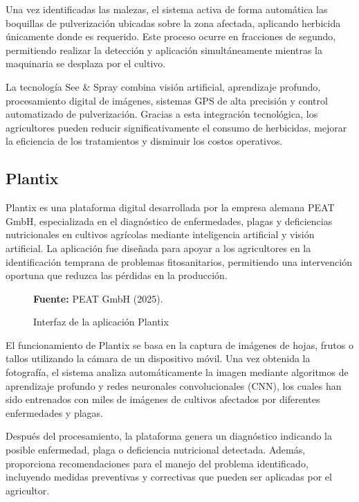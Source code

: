 Una vez identificadas las malezas, el sistema activa de forma automática las boquillas de pulverización ubicadas sobre la zona afectada, aplicando herbicida únicamente donde es requerido. Este proceso ocurre en fracciones de segundo, permitiendo realizar la detección y aplicación simultáneamente mientras la maquinaria se desplaza por el cultivo.

La tecnología See \& Spray combina visión artificial, aprendizaje profundo, procesamiento digital de imágenes, sistemas GPS de alta precisión y control automatizado de pulverización. Gracias a esta integración tecnológica, los agricultores pueden reducir significativamente el consumo de herbicidas, mejorar la eficiencia de los tratamientos y disminuir los costos operativos.


\subsection{Plantix}

Plantix es una plataforma digital desarrollada por la empresa alemana PEAT GmbH, especializada en el diagnóstico de enfermedades, plagas y deficiencias nutricionales en cultivos agrícolas mediante inteligencia artificial y visión artificial. La aplicación fue diseñada para apoyar a los agricultores en la identificación temprana de problemas fitosanitarios, permitiendo una intervención oportuna que reduzca las pérdidas en la producción.

\begin{figure}[H]
    \centering
    \caption{Interfaz de la aplicación Plantix}
    \label{fig:1_2_3}
    \vspace{0.2cm}
    \footnotesize \textbf{Fuente:} PEAT GmbH (2025).
\end{figure}

El funcionamiento de Plantix se basa en la captura de imágenes de hojas, frutos o tallos utilizando la cámara de un dispositivo móvil. Una vez obtenida la fotografía, el sistema analiza automáticamente la imagen mediante algoritmos de aprendizaje profundo y redes neuronales convolucionales (CNN), los cuales han sido entrenados con miles de imágenes de cultivos afectados por diferentes enfermedades y plagas.

Después del procesamiento, la plataforma genera un diagnóstico indicando la posible enfermedad, plaga o deficiencia nutricional detectada. Además, proporciona recomendaciones para el manejo del problema identificado, incluyendo medidas preventivas y correctivas que pueden ser aplicadas por el agricultor.


